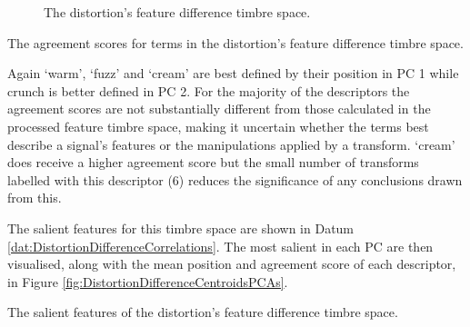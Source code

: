 \begin{figure}[h!]
{					\label{fig:DistortionDifferencePCA3-2}
				}
				\caption{The distortion's feature difference timbre space.}
				\label{fig:DistortionDifferencePCAs}
			\end{figure}

			\begin{table}[h!]
				\centering
				
				\centering
				\caption{The agreement scores for terms in the 
					 distortion's feature difference timbre space.}
				\label{tab:DistortionDifferenceAgreements}
			\end{table}

			Again `warm', `fuzz' and `cream' are best defined by their position in PC 1 while crunch is better
			defined in PC 2. For the majority of the descriptors the agreement scores are not substantially
			different from those calculated in the processed feature timbre space, making it uncertain whether
			the terms best describe a signal's features or the manipulations applied by a transform. `cream'
			does receive a higher agreement score but the small number of transforms labelled with this
			descriptor (6) reduces the significance of any conclusions drawn from this.

			The salient features for this timbre space are shown in Datum
			\ref{dat:DistortionDifferenceCorrelations}. The most salient in each PC are then visualised, along
			with the mean position and agreement score of each descriptor, in Figure
			\ref{fig:DistortionDifferenceCentroidsPCAs}. 

			\begin{datum}[h!]
				\centering
				\begin{minipage}{0.9\textwidth}
					
				\end{minipage}
				\caption{The salient features of the distortion's
					 feature difference timbre space.}
				\label{dat:DistortionDifferenceCorrelations}
			\end{datum}

